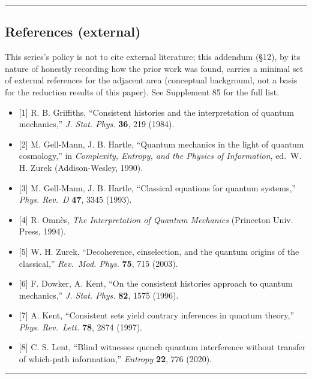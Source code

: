 \documentclass[
]{ltjsarticle}
\providecommand{\tightlist}{%
  \setlength{\itemsep}{0pt}\setlength{\parskip}{0pt}}
\begin{document}
\begin{center}\rule{0.5\linewidth}{0.5pt}\end{center}

\subsection{References (external)}\label{references-external}

This series's policy is not to cite external literature; this addendum
(§12), by its nature of honestly recording how the prior work was found,
carries a minimal set of external references for the adjacent area
(conceptual background, not a basis for the reduction results of this
paper). See Supplement 85 for the full list.

\begin{itemize}
\tightlist
\item
  {[}1{]} R. B. Griffiths, ``Consistent histories and the interpretation
  of quantum mechanics,'' \emph{J. Stat. Phys.} \textbf{36}, 219 (1984).
\item
  {[}2{]} M. Gell-Mann, J. B. Hartle, ``Quantum mechanics in the light
  of quantum cosmology,'' in \emph{Complexity, Entropy, and the Physics
  of Information}, ed.~W. H. Zurek (Addison-Wesley, 1990).
\item
  {[}3{]} M. Gell-Mann, J. B. Hartle, ``Classical equations for quantum
  systems,'' \emph{Phys. Rev.~D} \textbf{47}, 3345 (1993).
\item
  {[}4{]} R. Omnès, \emph{The Interpretation of Quantum Mechanics}
  (Princeton Univ. Press, 1994).
\item
  {[}5{]} W. H. Zurek, ``Decoherence, einselection, and the quantum
  origins of the classical,'' \emph{Rev.~Mod. Phys.} \textbf{75}, 715
  (2003).
\item
  {[}6{]} F. Dowker, A. Kent, ``On the consistent histories approach to
  quantum mechanics,'' \emph{J. Stat. Phys.} \textbf{82}, 1575 (1996).
\item
  {[}7{]} A. Kent, ``Consistent sets yield contrary inferences in
  quantum theory,'' \emph{Phys. Rev.~Lett.} \textbf{78}, 2874 (1997).
\item
  {[}8{]} C. S. Lent, ``Blind witnesses quench quantum interference
  without transfer of which-path information,'' \emph{Entropy}
  \textbf{22}, 776 (2020).
\end{itemize}

\begin{center}\rule{0.5\linewidth}{0.5pt}\end{center}
\end{document}
